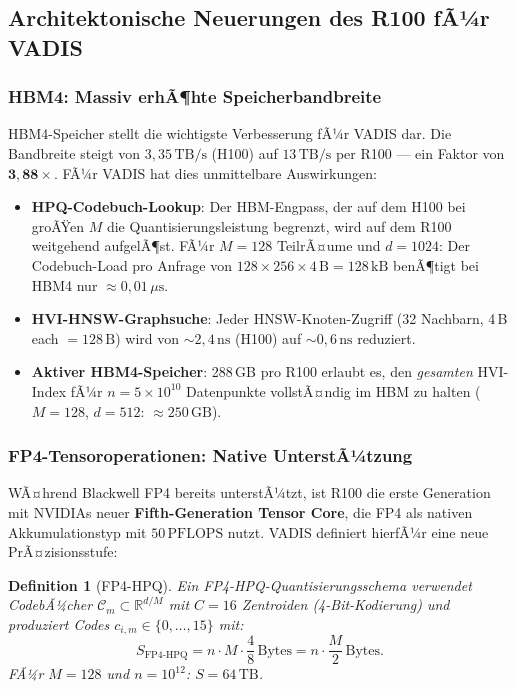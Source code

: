 ﻿\documentclass[12pt,a4paper]{article}
\newtheorem{definition}[theorem]{Definition}
\begin{document}
\subsection{Architektonische Neuerungen des R100 fÃ¼r VADIS}
\label{sub:r100_features}

\subsubsection{HBM4: Massiv erhÃ¶hte Speicherbandbreite}

HBM4-Speicher stellt die wichtigste Verbesserung fÃ¼r VADIS dar.
Die Bandbreite steigt von $3{,}35\,\text{TB/s}$ (H100) auf
$13\,\text{TB/s}$ per R100 --- ein Faktor von $\mathbf{3{,}88\times}$.
FÃ¼r VADIS hat dies unmittelbare Auswirkungen:

\begin{itemize}[leftmargin=1.4em, itemsep=2pt]
  \item \textbf{HPQ-Codebuch-Lookup}: Der HBM-Engpass, der auf dem
        H100 bei groÃŸen $M$ die Quantisierungsleistung begrenzt,
        wird auf dem R100 weitgehend aufgelÃ¶st. FÃ¼r $M = 128$
        TeilrÃ¤ume und $d = 1024$: Der Codebuch-Load pro
        Anfrage von $128 \times 256 \times 4\,\text{B} = 128\,\text{kB}$
        benÃ¶tigt bei HBM4 nur $\approx 0{,}01\,\mu\text{s}$.
  \item \textbf{HVI-HNSW-Graphsuche}: Jeder HNSW-Knoten-Zugriff
        (32 Nachbarn, 4\,B each $= 128\,\text{B}$) wird von
        $\sim 2{,}4\,\text{ns}$ (H100) auf $\sim 0{,}6\,\text{ns}$ reduziert.
  \item \textbf{Aktiver HBM4-Speicher}: 288\,GB pro R100 erlaubt
        es, den \emph{gesamten} HVI-Index fÃ¼r
        $n = 5 \times 10^{10}$ Datenpunkte vollstÃ¤ndig im HBM
        zu halten ($M=128$, $d=512$: $\approx 250\,\text{GB}$).
\end{itemize}

\subsubsection{FP4-Tensoroperationen: Native UnterstÃ¼tzung}

WÃ¤hrend Blackwell FP4 bereits unterstÃ¼tzt, ist R100 die erste
Generation mit NVIDIAs neuer \textbf{Fifth-Generation Tensor Core},
die FP4 als nativen Akkumulationstyp mit $50\,\text{PFLOPS}$ nutzt.
VADIS definiert hierfÃ¼r eine neue PrÃ¤zisionsstufe:

\begin{definition}[FP4-HPQ]
\label{def:fp4hpq}
Ein FP4-HPQ-Quantisierungsschema verwendet CodebÃ¼cher
$\mathcal{C}_m \subset \mathbb{R}^{d/M}$ mit $C = 16$
Zentroiden (4-Bit-Kodierung) und produziert Codes
$c_{i,m} \in \{0,\ldots,15\}$ mit:
\[
  S_{\text{FP4-HPQ}} = n \cdot M \cdot \frac{4}{8}\,\text{Bytes}
  = n \cdot \frac{M}{2}\,\text{Bytes}.
\]
FÃ¼r $M = 128$ und $n = 10^{12}$: $S = 64\,\text{TB}$.
\end{definition}
\end{document}
